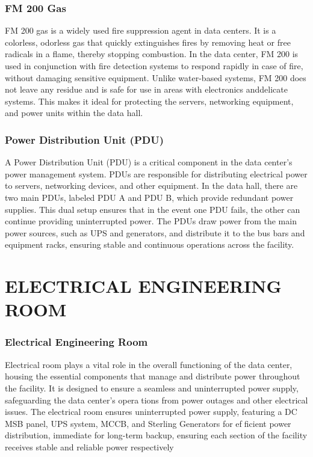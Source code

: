 \documentclass[12pt]{report}
\begin{document}
\begin{flushleft}
\subsection{ FM 200 Gas}
\begin{justify}
	FM 200 gas is a widely used fire suppression agent in data centers. It is a colorless, odorless
	gas that quickly extinguishes fires by removing heat or free radicals in a flame, thereby stopping
	combustion. In the data center, FM 200 is used in conjunction with fire detection systems to
	respond rapidly in case of fire, without damaging sensitive equipment. Unlike water-based
	systems, FM 200 does not leave any residue and is safe for use in areas with electronics anddelicate systems. This makes it ideal for protecting the servers, networking equipment, and
	power units within the data hall.
\end{justify}
\subsection{ Power Distribution Unit (PDU)}
\begin{justify}
	 A Power Distribution Unit (PDU) is a critical component in the data center’s power management
	 system. PDUs are responsible for distributing electrical power to servers, networking devices,
	 and other equipment. In the data hall, there are two main PDUs, labeled PDU A and PDU B,
	 which provide redundant power supplies. This dual setup ensures that in the event one PDU
	 fails, the other can continue providing uninterrupted power. The PDUs draw power from the
	 main power sources, such as UPS and generators, and distribute it to the bus bars and equipment
	 racks, ensuring stable and continuous operations across the facility.
\end{justify}
\chapter{ELECTRICAL ENGINEERING ROOM}
\subsection{Electrical Engineering Room}
\begin{justify}
	Electrical room plays a vital role in the overall functioning of the data center, housing the essential components that manage and distribute power throughout the facility. It is designed
	to ensure a seamless and uninterrupted power supply, safeguarding the data center’s operations from power outages and other electrical issues. The electrical room ensures uninterrupted
	power supply, featuring a DC MSB panel, UPS system, MCCB, and Sterling Generators for efficient power distribution, immediate for long-term backup, ensuring each section of the facility
	receives stable and reliable power respectively
\end{justify}

\end{flushleft}
\end{document}
